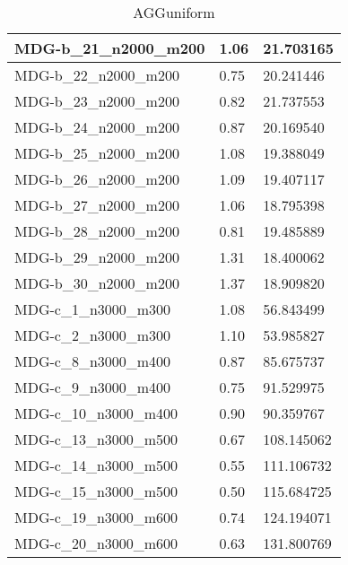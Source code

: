 \documentclass[10pt,a4paper]{article}
\begin{document}
\begin{table}[]
\begin{tabular}{|l|l|l|}
		MDG-b\_21\_n2000\_m200 & 1.06                               & 21.703165                            \\ \hline
		MDG-b\_22\_n2000\_m200 & 0.75                               & 20.241446                            \\ \hline
		MDG-b\_23\_n2000\_m200 & 0.82                               & 21.737553                            \\ \hline
		MDG-b\_24\_n2000\_m200 & 0.87                               & 20.169540                            \\ \hline
		MDG-b\_25\_n2000\_m200 & 1.08                               & 19.388049                            \\ \hline
		MDG-b\_26\_n2000\_m200 & 1.09                               & 19.407117                            \\ \hline
		MDG-b\_27\_n2000\_m200 & 1.06                               & 18.795398                            \\ \hline
		MDG-b\_28\_n2000\_m200 & 0.81                               & 19.485889                            \\ \hline
		MDG-b\_29\_n2000\_m200 & 1.31                               & 18.400062                            \\ \hline
		MDG-b\_30\_n2000\_m200 & 1.37                               & 18.909820                            \\ \hline
		MDG-c\_1\_n3000\_m300  & 1.08                               & 56.843499                            \\ \hline
		MDG-c\_2\_n3000\_m300  & 1.10                               & 53.985827                            \\ \hline
		MDG-c\_8\_n3000\_m400  & 0.87                               & 85.675737                            \\ \hline
		MDG-c\_9\_n3000\_m400  & 0.75                               & 91.529975                            \\ \hline
		MDG-c\_10\_n3000\_m400 & 0.90                               & 90.359767                            \\ \hline
		MDG-c\_13\_n3000\_m500 & 0.67                               & 108.145062                           \\ \hline
		MDG-c\_14\_n3000\_m500 & 0.55                               & 111.106732                           \\ \hline
		MDG-c\_15\_n3000\_m500 & 0.50                               & 115.684725                           \\ \hline
		MDG-c\_19\_n3000\_m600 & 0.74                               & 124.194071                           \\ \hline
		MDG-c\_20\_n3000\_m600 & 0.63                               & 131.800769                           \\ \hline
	\end{tabular}
	\caption{AGGuniform}
	\label{table:AGGuniform}
\end{table}
\end{document}
